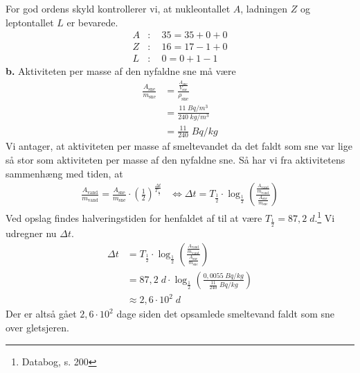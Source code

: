 \documentclass{report}
\begin{document}
For god ordens skyld kontrollerer vi, at nukleontallet $A$, ladningen $Z$ og leptontallet $L$ er bevarede.
\begin{equation*}
\begin{split}
A&:\quad 35 = 35 + 0 + 0\\ 
Z&:\quad 16 = 17 -1 + 0\\
L&:\quad 0 = 0 + 1 - 1
\end{split}
\end{equation*}
\textbf{b.}
Aktiviteten per masse af den nyfaldne sne må være
\begin{equation*}
\begin{split}
\frac{A_{\text{sne} }}{m_{\text{sne} }} &=\frac{\frac{A_{\text{sne} }}{V_{\text{sne} }}}{\rho_{\text{sne} } } \\
&=\frac{11 \;\unit{Bq/m^3} }{240 \;\unit{kg/m^3} }\\
&=\frac{11}{240} \;\unit{Bq/kg} 
\end{split}
\end{equation*}
Vi antager, at aktiviteten per masse af smeltevandet da det faldt som sne var lige så stor som aktiviteten per masse af den nyfaldne sne.
Så har vi fra aktivitetens sammenhæng med tiden, at 
\begin{equation*}
\begin{split}
\frac{A _{\text{vand} }}{m _{\text{vand} }}=\frac{A_{\text{sne} }}{m_{\text{sne} }} \cdot \left(\frac{1}{2}\right) ^{\frac{\Delta t}{T _{\frac{1}{2}}}} &\iff \Delta t=T _{\frac{1}{2}} \cdot \log_{\frac{1}{2}}\left(\frac{\frac{A _{\text{vand} }}{m _{\text{vand} }}}{\frac{A _{\text{sne} }}{m _{\text{sne} }}} \right) 
\end{split}
\end{equation*}
Ved opslag findes halveringstiden for henfaldet af  til at være $T _{\frac{1}{2}}=87,2 \;\unit{d} $.\footnote{Databog, s. 200}
Vi udregner nu $\Delta t$.
\begin{equation*}
\begin{split}
\Delta t&=T _{\frac{1}{2}} \cdot \log_{\frac{1}{2}}\left(\frac{\frac{A _{\text{vand} }}{m _{\text{vand} }}}{\frac{A _{\text{sne} }}{m _{\text{sne} }}} \right) \\
&=87,2 \;\unit{d} \cdot \log_{\frac{1}{2}}\left(\frac{0,0055 \;\unit{Bq/kg} }{\frac{11}{240}\;\unit{Bq/kg} }\right) \\
&\approx 2,6 \cdot 10^2 \;\unit{d} 
\end{split}
\end{equation*}
Der er altså gået $2,6 \cdot 10^2$ dage siden det opsamlede smeltevand faldt som sne over gletsjeren. 
\end{document}
